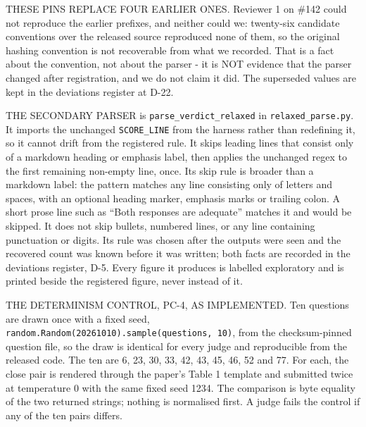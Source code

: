 THESE PINS REPLACE FOUR EARLIER ONES. Reviewer 1 on \#142 could not reproduce the earlier
prefixes, and neither could we: twenty-six candidate conventions over the released source
reproduced none of them, so the original hashing convention is not recoverable from what we
recorded. That is a fact about the convention, not about the parser - it is NOT evidence that
the parser changed after registration, and we do not claim it did. The superseded values are
kept in the deviations register at D-22.

THE SECONDARY PARSER is \texttt{parse\_verdict\_relaxed} in \texttt{relaxed\_parse.py}. It imports the unchanged
\texttt{SCORE\_LINE} from the harness rather than redefining it, so it cannot drift from the registered
rule. It skips leading lines that consist only of a markdown heading or emphasis label, then applies
the unchanged regex to the first remaining non-empty line, once. Its skip rule is broader than a markdown label: the pattern matches
any line consisting only of letters and spaces, with an optional heading marker, emphasis marks or
trailing colon. A short prose line such as ``Both responses are adequate'' matches it and would be
skipped. It does not skip bullets, numbered lines, or any line containing punctuation or digits. Its rule was chosen after the outputs were seen and the recovered count was known before
it was written; both facts are recorded in the deviations register, D-5. Every figure it produces is labelled
exploratory and is printed beside the registered figure, never instead of it.

THE DETERMINISM CONTROL, PC-4, AS IMPLEMENTED. Ten questions are drawn once with a fixed seed,
\texttt{random.Random(20261010).sample(questions,\ 10)}, from the checksum-pinned question file, so the draw
is identical for every judge and reproducible from the released code. The ten are 6, 23, 30, 33, 42,
43, 45, 46, 52 and 77. For each, the close pair is rendered through the paper's Table 1 template and
submitted twice at temperature 0 with the same fixed seed 1234. The comparison is byte equality of
the two returned strings; nothing is normalised first. A judge fails the control if any of the ten
pairs differs.

